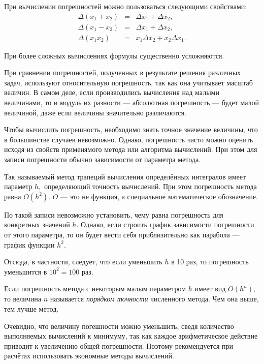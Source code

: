 
При вычислении погрешностей можно пользоваться следующими свойствами:
\begin{eqnarray*}
  \Delta(x_{1}+x_{2}) & = & \Delta x_{1}+\Delta x_{2},\\
  \Delta(x_{1}-x_{2}) & = & \Delta x_{1}+\Delta x_{2},\\
  \Delta(x_{1}x_{2}) & = & x_{1}\Delta x_{2}+x_{2}\Delta x_{1}.
\end{eqnarray*}

При более сложных вычислениях формулы существенно усложняются.

При сравнении погрешностей, полученных в результате решения различных
задач, используют относительную погрешность, так как она учитывает
масштаб величин. В самом деле, если производились вычисления над
малыми величинами, то и модуль их разности — абсолютная погрешность —
будет малой величиной, даже если величины значительно различаются.


Чтобы вычислить погрешность, необходимо знать точное значение
величины, что в большинстве случаев невозможно. Однако, погрешность
часто можно оценить исходя из свойств применямого метода или алгоритма
вычислений.  При этом для записи погрешности обычно зависимости от
параметра метода.

\begin{example}
  Так называемый метод трапеций вычисления определённых интегралов
  имеет параметр $h,$ определяющий точность вычислений. При этом
  погрешность метода равна $O(h^{2}).$ $O$ — это не функция, а
  специальное математическое обозначение.
  
  По такой записи невозможно установить, чему равна погрешность для
  конкретных значений $h.$ Однако, если строить график зависимости
  погрешности от этого параметра, то он будет вести себя
  приблизительно как парабола — график функции $h^{2}.$

  Отсюда, в частности, следует, что если уменьшить $h$ в 10 раз, то
  погрешность уменьшится в $10^{2}=100$ раз.
\end{example}

Если погрешность метода с некоторым малым параметром $h$ имеет вид
$O(h^{n}),$ то величина $n$ называется \emph{порядком точности}
численного метода. Чем она выше, тем лучше метод.

Очевидно, что величину погешности можно уменьшить, сведя количество
выполняемых вычислений к минимуму, так как каждое арифметическое
действие приводит к увеличению общей погрешности. Поэтому
рекомендуется при расчётах использовать экономные методы вычислений.

